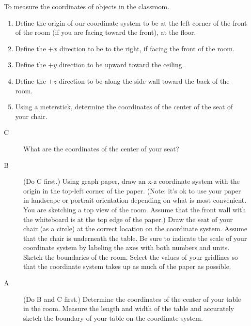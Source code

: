 
\apparatus
{}

\longgoal

To measure the coordinates of objects in the classroom.

\procedure

\begin{enumerate}
	\item Define the origin of our coordinate system to be at the left corner of the front of the room (if you are facing toward the front), at the floor.
	\item Define the $+x$ direction to be to the right, if facing the front of the room.
	\item Define the $+y$ direction to be upward toward the ceiling.
	\item Define the $+z$ direction to be along the side wall toward the back of the room.
	\item Using a meterstick, determine the coordinates of the center of the seat of your chair.
\end{enumerate}

\extension

\begin{description}
	\item [C] What are the coordinates of the center of your seat?
	\item [B] (Do C first.) Using graph paper, draw an x-z coordinate system with the origin in the top-left corner of the paper. (Note: it's ok to use your paper in landscape or portrait orientation depending on what is most convenient. You are sketching a top view of the room. Assume that the front wall with the whiteboard is at the top edge of the paper.) Draw the seat of your chair (as a circle) at the correct location on the coordinate system. Assume that the chair is underneath the table. Be sure to indicate the scale of your coordinate system by labeling the axes with both numbers and units. Sketch the boundaries of the room. Select the values of your gridlines so that the coordinate system takes up as much of the paper as possible.
	\item [A]  (Do B and C first.) Determine the coordinates of the center of your table in the room. Measure the length and width of the table and accurately sketch the boundary of your table on the coordinate system.
\end{description}
